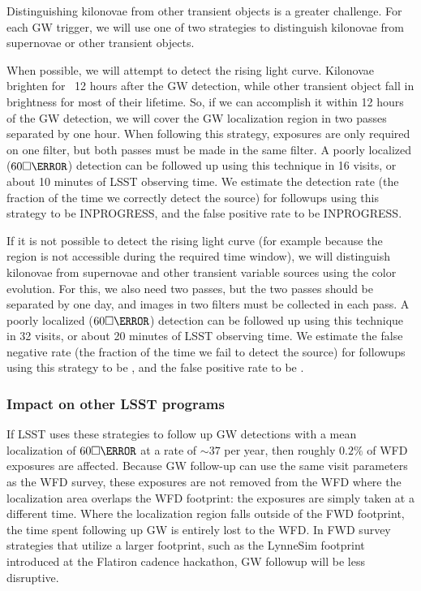 Distinguishing kilonovae from other transient objects is a greater challenge. For each GW trigger, we will use one of two strategies to distinguish kilonovae from supernovae or other transient objects.

When possible, we will attempt to detect the rising light curve. Kilonovae brighten for ~12 hours after the GW detection, while other transient object fall in brightness for most of their lifetime. So, if we can accomplish it within 12 hours of the GW detection, we will cover the GW localization region in two passes separated by one hour. When following this strategy, exposures are only required on one filter, but both passes must be made in the same filter. A poorly localized ($60 \square\degree$) detection can be followed up using this technique in 16 visits, or about 10 minutes of LSST observing time. We estimate the detection rate (the fraction of the time we correctly detect the source) for followups using this strategy to be INPROGRESS, and the false positive rate to be INPROGRESS.

If it is not possible to detect the rising light curve (for example because the region is not accessible during the required time window), we will distinguish kilonovae from supernovae and other transient variable sources using the color evolution. For this, we also need two passes, but the two passes should be separated by one day, and images in two filters must be collected in each pass. A poorly localized ($60 \square\degree$) detection can be followed up using this technique in 32 visits, or about 20 minutes of LSST observing time. We estimate the false negative rate (the fraction of the time we fail to detect the source) for followups using this strategy to be \todo{}, and the false positive rate to be \todo{}.


\subsubsection{Impact on other LSST programs}

If LSST uses these strategies to follow up GW detections with a mean localization of $60\square\degree$ at a rate of $\sim 37$ per year, then roughly $0.2\%$ of WFD exposures are affected. Because GW follow-up can use the same visit parameters as the WFD survey, these exposures are not removed from the WFD where the localization area overlaps the WFD footprint: the exposures are simply taken at a different time. Where the localization region falls outside of the FWD footprint, the time spent following up GW is entirely lost to the WFD. In FWD survey strategies that utilize a larger footprint, such as the LynneSim footprint introduced at the Flatiron cadence hackathon, GW followup will be less disruptive. 

